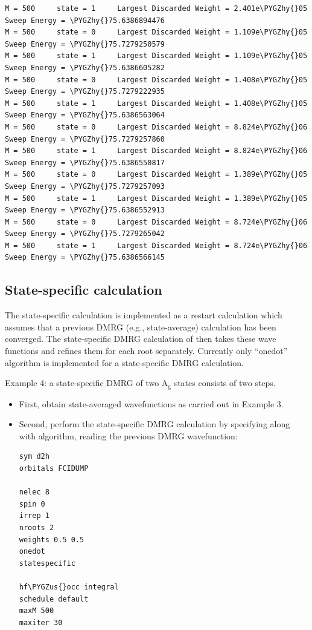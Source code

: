 \documentclass[letterpaper,10pt,english]{sphinxmanual}
\def\PYGZus{\char`\_}
\def\PYGZhy{\char`\-}
\begin{document}
\begin{Verbatim}[commandchars=\\\{\}]
M = 500     state = 1     Largest Discarded Weight = 2.401e\PYGZhy{}05  Sweep Energy = \PYGZhy{}75.6386894476
M = 500     state = 0     Largest Discarded Weight = 1.109e\PYGZhy{}05  Sweep Energy = \PYGZhy{}75.7279250579
M = 500     state = 1     Largest Discarded Weight = 1.109e\PYGZhy{}05  Sweep Energy = \PYGZhy{}75.6386605282
M = 500     state = 0     Largest Discarded Weight = 1.408e\PYGZhy{}05  Sweep Energy = \PYGZhy{}75.7279222935
M = 500     state = 1     Largest Discarded Weight = 1.408e\PYGZhy{}05  Sweep Energy = \PYGZhy{}75.6386563064
M = 500     state = 0     Largest Discarded Weight = 8.824e\PYGZhy{}06  Sweep Energy = \PYGZhy{}75.7279257860
M = 500     state = 1     Largest Discarded Weight = 8.824e\PYGZhy{}06  Sweep Energy = \PYGZhy{}75.6386550817
M = 500     state = 0     Largest Discarded Weight = 1.389e\PYGZhy{}05  Sweep Energy = \PYGZhy{}75.7279257093
M = 500     state = 1     Largest Discarded Weight = 1.389e\PYGZhy{}05  Sweep Energy = \PYGZhy{}75.6386552913
M = 500     state = 0     Largest Discarded Weight = 8.724e\PYGZhy{}06  Sweep Energy = \PYGZhy{}75.7279265042
M = 500     state = 1     Largest Discarded Weight = 8.724e\PYGZhy{}06  Sweep Energy = \PYGZhy{}75.6386566145
\end{Verbatim}


\subsection{State-specific calculation}
\label{examples:state-specific-calculation}
The state-specific calculation is implemented as a restart calculation which assumes
that a previous DMRG (e.g., state-average) calculation has been converged.
The state-specific DMRG calculation of  then takes these wave functions and refines them for each root separately.
Currently only ``onedot'' algorithm is implemented for a state-specific DMRG calculation.

Example 4: a state-specific DMRG of two A$_{\text{g}}$ states consists of two steps.
\begin{itemize}
\item {} 
First, obtain state-averaged wavefunctions as carried out in Example 3.

\item {} 
Second, perform the state-specific DMRG calculation by specifying  along with algorithm, reading the previous DMRG wavefunction:

\begin{Verbatim}[commandchars=\\\{\}]
sym d2h
orbitals FCIDUMP

nelec 8
spin 0
irrep 1
nroots 2
weights 0.5 0.5
onedot
statespecific

hf\PYGZus{}occ integral
schedule default
maxM 500
maxiter 30
\end{Verbatim}

\end{itemize}
\end{document}
